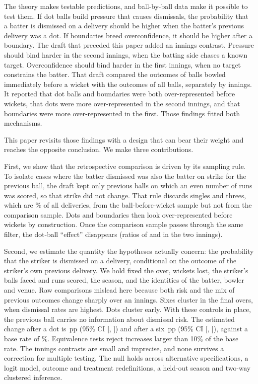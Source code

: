 \documentclass[11pt]{article}
\newcommand{\pp}{\,pp}
\begin{document}
The theory makes testable predictions, and ball-by-ball data make it possible to test them. If dot balls build pressure that causes dismissals, the probability that a batter is dismissed on a delivery should be higher when the batter's previous delivery was a dot. If boundaries breed overconfidence, it should be higher after a boundary. The draft that preceded this paper added an innings contrast. Pressure should bind harder in the second innings, when the batting side chases a known target. Overconfidence should bind harder in the first innings, when no target constrains the batter. That draft compared the outcomes of balls bowled immediately before a wicket with the outcomes of all balls, separately by innings. It reported that dot balls and boundaries were both over-represented before wickets, that dots were more over-represented in the second innings, and that boundaries were more over-represented in the first. Those findings fitted both mechanisms.

This paper revisits those findings with a design that can bear their weight and reaches the opposite conclusion. We make three contributions.

First, we show that the retrospective comparison is driven by its sampling rule. To isolate cases where the batter dismissed was also the batter on strike for the previous ball, the draft kept only previous balls on which an even number of runs was scored, so that strike did not change. That rule discards singles and threes, which are \OrigFilterDropShare\% of all deliveries, from the ball-before-wicket sample but not from the comparison sample. Dots and boundaries then look over-represented before wickets by construction. Once the comparison sample passes through the same filter, the dot-ball ``effect'' disappears (ratios of \OrigZeroOneRatioFilt{} and \OrigZeroTwoRatioFilt{} in the two innings).

Second, we estimate the quantity the hypotheses actually concern: the probability that the striker is dismissed on a delivery, conditional on the outcome of the striker's own previous delivery. We hold fixed the over, wickets lost, the striker's balls faced and runs scored, the season, and the identities of the batter, bowler and venue. Raw comparisons mislead here because both risk and the mix of previous outcomes change sharply over an innings. Sixes cluster in the final overs, when dismissal rates are highest. Dots cluster early. With these controls in place, the previous ball carries no information about dismissal risk. The estimated change after a dot is \FullDot\pp{} (95\% CI [\FullDotLo, \FullDotHi]) and after a six \FullSix\pp{} (95\% CI [\FullSixLo, \FullSixHi]), against a base rate of \BaseRate\%. Equivalence tests reject increases larger than 10\% of the base rate. The innings contrasts are small and imprecise, and none survives a correction for multiple testing. The null holds across \RobRows{} alternative specifications, a logit model, outcome and treatment redefinitions, a held-out season and two-way clustered inference.
\end{document}
